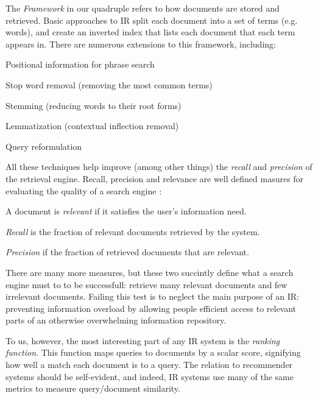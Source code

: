 The \emph{Framework} in our quadruple refers to how documents are stored and retrieved.
Basic approaches to IR split each document into a set of terms (e.g. words),
and create an inverted index \cite[p22]{Manning2008} that lists each document that each term appears in.
There are numerous extensions to this framework, including: 

\begin{itemize*}
  \item Positional information for phrase search \cite[p39]{Manning2008}
  \item Stop word removal (removing the most common terms) \cite[p27]{Manning2008}
  \item Stemming (reducing words to their root forms) \cite[p32]{Manning2008}
  \item Lemmatization (contextual inflection removal) \cite[p32]{Manning2008}
  \item Query reformulation \citep[p117]{Baeza-Yates1999}
\end{itemize*}

All these techniques help improve (among other things)
the \emph{recall} and \emph{precision} of the retrieval engine. 
Recall, precision and relevance are well defined masures for evaluating the quality of a search engine \cite[p5]{Manning2008}:

\begin{itemize*}
  \item A document is \emph{relevant} if it satisfies the user's information need.
  \item \emph{Recall} is the fraction of relevant documents retrieved by the system.
  \item \emph{Precision} if the fraction of retrieved documents that are relevant.
\end{itemize*}

There are many more measures, but these two succintly define what a search engine must to
to be successfull: retrieve many relevant documents and few irrelevant documents.
Failing this test is to neglect the main purpose of an IR:
preventing information overload by allowing people efficient access 
to relevant parts of an otherwise overwhelming information repository.

To us, however, the most interesting part of any IR system is the \emph{ranking function}.
This function maps queries to documents by a scalar score, signifying how well a match
each document is to a query. The relation to recommender systems should be self-evident,
and indeed, IR systems use many of the same metrics to measure query/document similarity.

